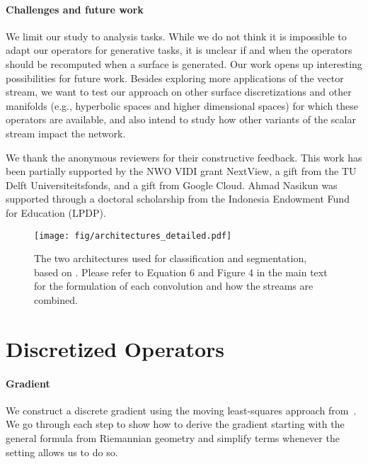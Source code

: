\documentclass[acmtog, authorversion]{acmart}
\begin{document}
\paragraph*{Challenges and future work}
We limit our study to analysis tasks. While we do not think it is impossible to adapt our operators for generative tasks, it is unclear if and when the operators should be recomputed when a surface is generated. Our work opens up interesting possibilities for future work. Besides exploring more applications of the vector stream, we want to test our approach on other surface discretizations and other manifolds (e.g., hyperbolic spaces and higher dimensional spaces) for which these operators are available, and also intend to study how other variants of the scalar stream impact the network. \begin{acks}
We thank the anonymous reviewers for their constructive feedback. This work has been partially supported by the NWO VIDI grant NextView, a gift from the TU Delft Universiteitsfonds, and a gift from Google Cloud. Ahmad Nasikun was supported through a doctoral scholarship from the Indonesia Endowment Fund for Education (LPDP).
\end{acks} 



\appendix
\begin{figure*}[t]
    \texttt{[image: fig/architectures\_detailed.pdf]}
    \caption{The two architectures used for classification and segmentation, based on \cite{Wang2019}. Please refer to Equation 6 and Figure 4 in the main text for the formulation of each convolution and how the streams are combined.}
    \label{fig:architecture}
    \centering
\end{figure*}

\section{Discretized Operators}
\paragraph{Gradient}
We construct a discrete gradient using the moving least-squares approach from~\cite{Liang2013SolvingPD}. We go through each step to show how to derive the gradient starting with the general formula from Riemannian geometry and simplify terms whenever the setting allows us to do so. 
\end{document}

